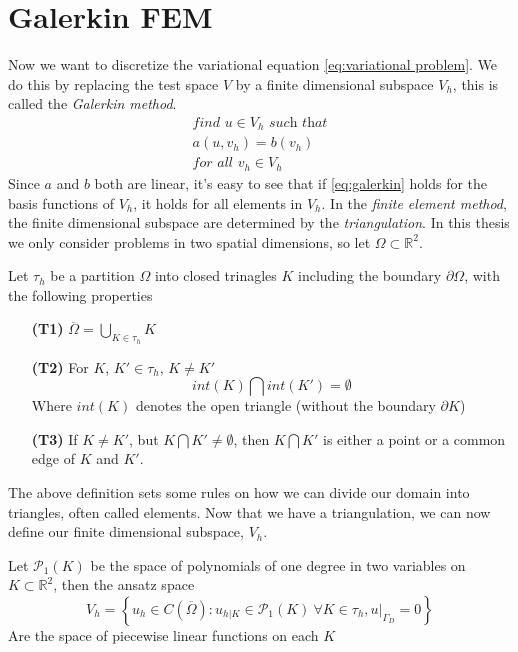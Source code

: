 \documentclass[../Main/main.tex]{subfiles}
\begin{document}
	\section*{Galerkin FEM} \label{galerkin_fem}
	Now we want to discretize the variational equation \eqref{eq:variational problem}. We do this by replacing the test space $V$ by a finite dimensional subspace $V_h$, this is called the \emph{Galerkin method}.
	\begin{equation}\label{eq:galerkin}
		\begin{gathered}
			\textit{find }u \in V_h \textit{ such that}\\
			a(u,v_h) = b(v_h) \\
			\textit{for all }v_h\in V_h
		\end{gathered}
	\end{equation}
	Since $a$ and $b$ both are linear, it's easy to see that if \eqref{eq:galerkin} holds for the basis functions of $V_h$, it holds for all elements in $V_h$. In the \emph{finite element method}, the finite dimensional subspace are determined by the \emph{triangulation}. In this thesis we only consider problems in two spatial dimensions, so let $\Omega \subset \mathbb{R}^2$. 
	\begin{definition}
		Let $\tau_h$ be a partition $\Omega$ into closed trinagles $K$ including the boundary $\partial \Omega$, with the following properties
		\begin{itemize}
			\item[\textbf{(T1)}] $\overline{\Omega} = \bigcup_{K\in \tau_h}K$ 
			\item[\textbf{(T2)}] For $K$, $K' \in \tau_h$, $K \neq K'$ \begin{equation*}
				int(K) \bigcap int(K')=\emptyset
			\end{equation*} 
			Where $int(K)$ denotes the open triangle (without the boundary $\partial K$)
			\item[\textbf{(T3)}] If $K\neq K'$, but $K\bigcap K' \neq \emptyset$, then $K\bigcap K'$ is either a point or a common edge of $K$ and $K'$.
			
		\end{itemize}
	\end{definition}
	The above definition sets some rules on how we can divide our domain into triangles, often called elements.
	Now that we have a triangulation, we can now define our finite dimensional subspace, $V_h$.
	\begin{definition}\label{def:linear ansatz}
		Let $\mathcal{P}_1(K)$ be the space of polynomials of one degree in two variables on $K\subset \mathbb{R}^2$, then the ansatz space
		\begin{equation*}
			V_h = \left \{ u_h \in C(\overline{\Omega}) : u_{h|K} \in \mathcal{P}_1(K) \ \forall K \in \tau_h, u|_{\Gamma_D} = 0  \right \}
		\end{equation*}
		Are the space of piecewise linear functions on each $K$
	\end{definition}
\end{document}
